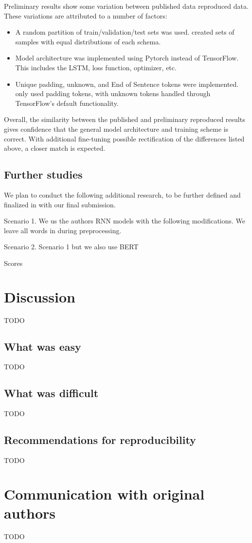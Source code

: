 \documentclass[11pt,a4paper]{article}
\begin{document}
Preliminary results show some variation between published data reproduced data. These variations are attributed to a number of factors: 
\begin{itemize}
  \item A random partition of train/validation/test sets was used. \citeauthor{burger_2021} created sets of samples with equal distributions of each schema. 
  \item Model architecture was implemented using Pytorch instead of TensorFlow. This includes the LSTM, loss function, optimizer, etc.
  \item Unique padding, unknown, and End of Sentence tokens were implemented. \citeauthor{burger_2021} only used padding tokens, with unknown tokens handled through TensorFlow's default functionality.
\end{itemize}
Overall, the similarity between the published and preliminary reproduced results gives confidence that the general model architecture and training scheme is correct. With additional fine-tuning possible rectification of the differences listed above, a closer match is expected. 

\subsection{Further studies}
\label{further_studies}

We plan to conduct the following additional research, to be further defined and finalized in with our final submission. 

Scenario 1. We us the authors RNN models with the following modifications. We leave all words in during preprocessing. 

Scenario 2. Scenario 1 but we also use BERT 

Scores

\section{Discussion}
TODO
\subsection{What was easy}
TODO
\subsection{What was difficult}
TODO
\subsection{Recommendations for reproducibility}
TODO
\section{Communication with original authors}
TODO



\end{document}

